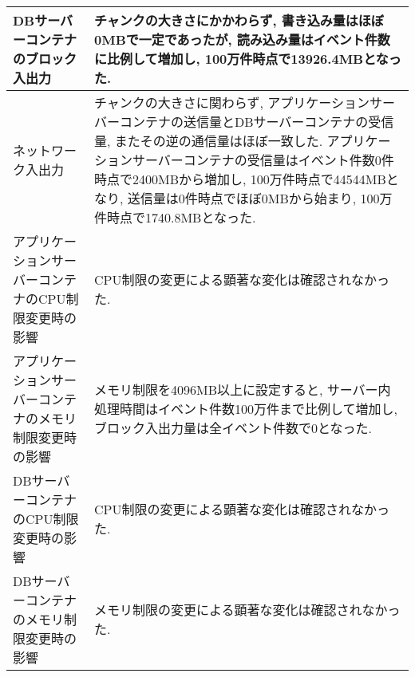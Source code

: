 \documentclass[../../../main]{subfiles}
\begin{document}
\begin{table}[H]
\begin{tabular}{|p{4cm}|p{10cm}|}
            DBサーバーコンテナのブロック入出力           & チャンクの大きさにかかわらず, 書き込み量はほぼ0MBで一定であったが, 読み込み量はイベント件数に比例して増加し, 100万件時点で13926.4MBとなった.                                                                                               \\ \hline
            ネットワーク入出力                    & チャンクの大きさに関わらず, アプリケーションサーバーコンテナの送信量とDBサーバーコンテナの受信量, またその逆の通信量はほぼ一致した. アプリケーションサーバーコンテナの受信量はイベント件数0件時点で2400MBから増加し, 100万件時点で44544MBとなり, 送信量は0件時点でほぼ0MBから始まり, 100万件時点で1740.8MBとなった.  \\ \hline
            アプリケーションサーバーコンテナのCPU制限変更時の影響 & CPU制限の変更による顕著な変化は確認されなかった.                                                                                                                                                  \\ \hline
            アプリケーションサーバーコンテナのメモリ制限変更時の影響 & メモリ制限を4096MB以上に設定すると, サーバー内処理時間はイベント件数100万件まで比例して増加し, ブロック入出力量は全イベント件数で0となった.                                                                                                   \\ \hline
            DBサーバーコンテナのCPU制限変更時の影響       & CPU制限の変更による顕著な変化は確認されなかった.                                                                                                                                                  \\ \hline
            DBサーバーコンテナのメモリ制限変更時の影響       & メモリ制限の変更による顕著な変化は確認されなかった.                                                                                                                                                  \\ \hline
        \end{tabular}
    \end{table}
\end{document}
